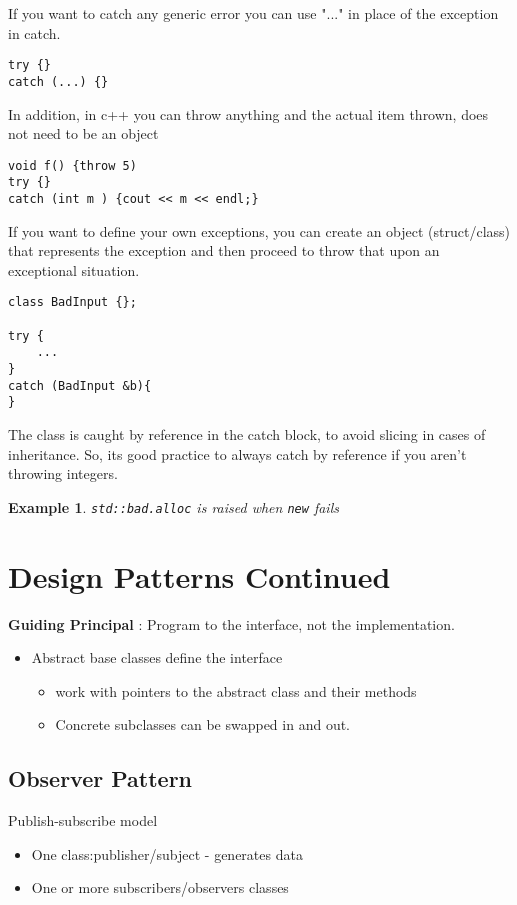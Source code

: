 \documentclass{article}
\newtheorem{ex}[theorem]{Example}
\begin{document}
If you want to catch any generic error you can use "..." in place of the exception in catch.
\begin{lstlisting}
try {}
catch (...) {}
\end{lstlisting}

In addition, in c++ you can throw anything and the actual item thrown, does not need to be an object 

\begin{lstlisting}
void f() {throw 5)
try {}
catch (int m ) {cout << m << endl;}
\end{lstlisting}

If you want to define your own exceptions, you can create an object (struct/class) that represents the exception and then proceed to throw that upon an exceptional situation. 

\begin{lstlisting}
class BadInput {};

try {
	...
}
catch (BadInput &b){
}
\end{lstlisting}

The class is caught by reference in the catch block, to avoid slicing in cases of inheritance. So, its good practice to always catch by reference if you aren't throwing integers. 

\begin{ex} \verb|std::bad.alloc| is raised when \verb|new| fails\end{ex}

\section{Design Patterns Continued}

\textbf{Guiding Principal} : Program to the interface, not the implementation. 

\begin{itemize}
\item Abstract base classes define the interface
\begin{itemize}
\item work with pointers to the abstract class and their methods
\item Concrete subclasses can be swapped in and out. 
\end{itemize}
\end{itemize}

\subsection{Observer Pattern}
Publish-subscribe model 
\begin{itemize}
\item One class:publisher/subject - generates data
\item One or more subscribers/observers classes 
\end{itemize}
\end{document}
